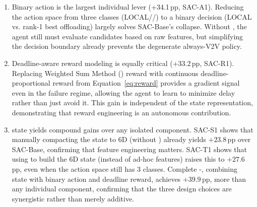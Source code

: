 \begin{enumerate}[label=(\arabic*),leftmargin=*]
  \item Binary action is the largest individual lever (+34.1\,pp, SAC-A1). Reducing the action space from three classes (LOCAL//) to a binary decision (LOCAL vs. rank-1 best offloading) largely solves SAC-Base's collapse. Without , the agent still must evaluate candidates based on raw features, but simplifying the decision boundary already prevents the degenerate always-V2V policy.
  
  \item Deadline-aware reward modeling is equally critical (+33.2\,pp, SAC-R1). Replacing Weighted Sum Method () reward with continuous deadline-proportional reward from Equation~\eqref{eq:reward} provides a gradient signal even in the failure regime, allowing the agent to learn to minimize delay rather than just avoid it. This gain is independent of the state representation, demonstrating that reward engineering is an autonomous contribution.
  
  \item {} state yields compound gains over any isolated component. SAC-S1 shows that manually compacting the state to 6D (without ) already yields $+23.8$\,pp over SAC-Base, confirming that feature engineering matters. SAC-T1 shows that using  to build the 6D state (instead of ad-hoc features) raises this to $+27.6$\,pp, even when the action space still has 3 classes. Complete -, combining  state with binary action and deadline reward, achieves $+39.9$\,pp, more than any individual component, confirming that the three design choices are synergistic rather than merely additive.
\end{enumerate}

